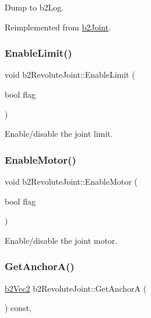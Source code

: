 Dump to b2\+Log. 



Reimplemented from \mbox{\hyperlink{classb2_joint_abd35e7316017ad9a40d5dbf9b5ba3f36}{b2\+Joint}}.

\mbox{\label{classb2_revolute_joint_a56bdfdd04e906e52d0258f6a481b9093}} 
\subsubsection{\texorpdfstring{EnableLimit()}{EnableLimit()}}
{\footnotesize\ttfamily void b2\+Revolute\+Joint\+::\+Enable\+Limit (\begin{DoxyParamCaption}\item[{bool}]{flag }\end{DoxyParamCaption})}



Enable/disable the joint limit. 

\mbox{\label{classb2_revolute_joint_a80ed5a07d9a0e07d010808a73ffae6ff}} 
\subsubsection{\texorpdfstring{EnableMotor()}{EnableMotor()}}
{\footnotesize\ttfamily void b2\+Revolute\+Joint\+::\+Enable\+Motor (\begin{DoxyParamCaption}\item[{bool}]{flag }\end{DoxyParamCaption})}



Enable/disable the joint motor. 

\mbox{\label{classb2_revolute_joint_a9878591c460a4e1575f8a77c237608ae}} 
\subsubsection{\texorpdfstring{GetAnchorA()}{GetAnchorA()}}
{\footnotesize\ttfamily \mbox{\hyperlink{structb2_vec2}{b2\+Vec2}} b2\+Revolute\+Joint\+::\+Get\+AnchorA (\begin{DoxyParamCaption}{ }\end{DoxyParamCaption}) const\hspace{0.3cm}{\ttfamily [override]}, {\ttfamily [virtual]}}



